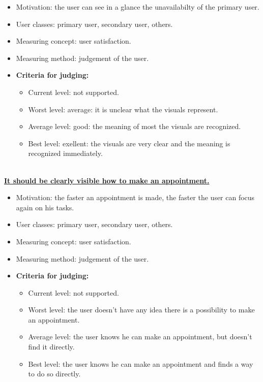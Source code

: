\documentclass[11pt, a4paper,svglistings]{report}
\begin{document}
\begin{itemize}
\item{Motivation: the user can see in a glance the unavailabilty of the primary user.}
\item{User classes: primary user, secondary user, others.}
\item{Measuring concept: user satisfaction.}
\item{Measuring method: judgement of the user.}
\item{\textbf{Criteria for judging:}}
\begin{itemize}
\item{Current level: not supported.}
\item{Worst level: average: it is unclear what the visuals represent.}
\item{Average level: good: the meaning of most the visuals are recognized.}
\item{Best level: exellent: the visuals are very clear and the meaning is recognized immediately. \\ \\}
\end{itemize}
\end{itemize}
\textbf{\underline{It should be clearly visible how to make an appointment.}}
\begin{itemize}
\item{Motivation: the faster an appointment is made, the faster the user can focus again on his tasks.}
\item{User classes: primary user, secondary user, others.}
\item{Measuring concept: user satisfaction.}
\item{Measuring method: judgement of the user.}
\item{\textbf{Criteria for judging:}}
\begin{itemize}
\item{Current level: not supported.}
\item{Worst level: the user doesn't have any idea there is a possibility to make an appointment.}
\item{Average level: the user knows he can make an appointment, but doesn't find it directly.}
\item{Best level: the user knows he can make an appointment and finds a way to do so directly. \\ \\}
\end{itemize}
\end{itemize}
\end{document}
